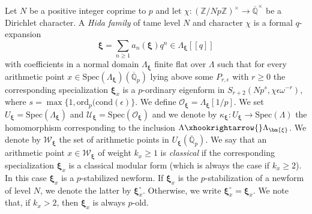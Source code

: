 \documentclass[a4paper,11pt]{amsart}
\theoremstyle{plain}
\theoremstyle{definition}
\theoremstyle{remark}
\newcommand{\bb}{\mathbb}
\newcommand{\cl}{\mathcal}
\DeclareMathOperator{\cla}{cl}
\newcommand{\ord}{{\mathrm{ord}}}
\newcommand{\hf}{{\mathbf{f}}}
\numberwithin{equation}{section}
\begin{document}
Let $N$ be a positive integer coprime to $p$ and let $\chi:(\bb{Z}/Np\bb{Z})^\times \rightarrow \overline{\bb{Q}}^\times$ be a Dirichlet character. A \emph{Hida family} of tame level $N$ and character $\chi$ is a formal $q$-expansion
\[
\bm{\xi}=\sum_{n\geq 1} a_n(\bm{\xi}) q^n \in \Lambda_{\bm{\xi}}[[q]]
\]
with coefficients in a normal domain $\Lambda_{\bm{\xi}}$ finite flat over $\Lambda$ such that for every arithmetic point $x\in \mathrm{Spec}(\Lambda_{\bm{\xi}})(\overline{\bb{Q}}_p)$ lying above some $P_{r,\epsilon}$ with $r\geq 0$ the corresponding specialization $\bm{\xi}_x$ is a $p$-ordinary eigenform in $S_{r+2}(Np^s,\chi \epsilon \omega^{-r})$, where $s=\max\lbrace 1,\ord_p(\mathrm{cond}(\epsilon)\rbrace$. We define $\cl{O}_{\bm{\xi}}=\Lambda_{\bm{\xi}}[1/p]$. We set $U_{\bm{\xi}}=\mathrm{Spec}(\Lambda_{\bm{\xi}})$ and $\cl{U}_{\bm{\xi}}=\mathrm{Spec}(\cl{O}_{\bm{\xi}})$ and we denote by $\kappa_{\bm{\xi}}:U_{\bm{\xi}}\rightarrow \mathrm{Spec}(\Lambda)$ the homomorphism corresponding to the inclusion $\Lambda \xhookrightarrow{} \Lambda_{\bm{\xi}}$. We denote by $\cl{W}_{\bm{\xi}}$ the set of arithmetic points in $U_{\bm{\xi}}(\overline{\bb{Q}}_p)$. We say that an arithmetic point $x\in \cl{W}_{\bm{\xi}}$ of weight $k_x\geq 1$ is \emph{classical} if the corresponding specialization $\bm{\xi}_x$ is a classical modular form (which is always the case if $k_x\geq 2$). In this case $\bm{\xi}_x$ is a $p$-stabilized newform. If $\bm{\xi}_x$ is the $p$-stabilization of a newform of level $N$, we denote the latter by $\bm{\xi}_x^{\circ}$. Otherwise, we write $\bm{\xi}_x^\circ=\bm{\xi}_x$. We note that, if $k_x>2$, then $\bm{\xi}_x$ is always $p$-old.


\end{document}
